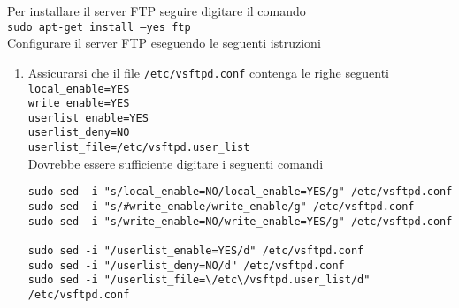 \documentclass[a4paper,twoside,10pt,openany]{scrbook}
\begin{document}
Per installare il server FTP seguire digitare il comando\\
\texttt{sudo apt-get install --yes ftp}\\ 
Configurare il server FTP eseguendo le seguenti istruzioni
\begin{enumerate}
 \item Assicurarsi che il file \texttt{/etc/vsftpd.conf} contenga le righe seguenti\\
       \texttt{local\_enable=YES}\\
       \texttt{write\_enable=YES}\\
       \texttt{userlist\_enable=YES}\\
       \texttt{userlist\_deny=NO}\\
       \texttt{userlist\_file=/etc/vsftpd.user\_list}\\
       Dovrebbe essere sufficiente digitare i seguenti comandi
\begin{verbatim} 
sudo sed -i "s/local_enable=NO/local_enable=YES/g" /etc/vsftpd.conf
sudo sed -i "s/#write_enable/write_enable/g" /etc/vsftpd.conf
sudo sed -i "s/write_enable=NO/write_enable=YES/g" /etc/vsftpd.conf

sudo sed -i "/userlist_enable=YES/d" /etc/vsftpd.conf
sudo sed -i "/userlist_deny=NO/d" /etc/vsftpd.conf
sudo sed -i "/userlist_file=\/etc\/vsftpd.user_list/d" /etc/vsftpd.conf


\end{verbatim}
\end{enumerate}
\end{document}
